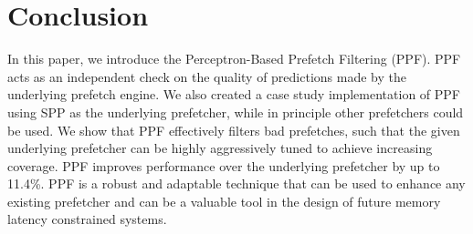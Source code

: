 \section{Conclusion}
\label{Conclusion}
In this paper, we introduce the Perceptron-Based Prefetch Filtering
(PPF).  PPF acts as an independent check on the quality of predictions
made by the underlying prefetch engine.  We also created a case study
implementation of PPF using SPP as the {\color{red}underlying prefetcher}, while
in principle other prefetchers could be used.  We show that PPF
effectively filters bad prefetches, such that the given underlying
prefetcher can be highly aggressively tuned to achieve increasing
coverage.  PPF improves performance over the {\color{red}underlying} 
prefetcher by up to 11.4\%.  PPF is a robust and adaptable technique 
that can be used to enhance any existing prefetcher and can be a 
valuable tool in the design of future memory latency constrained systems.
